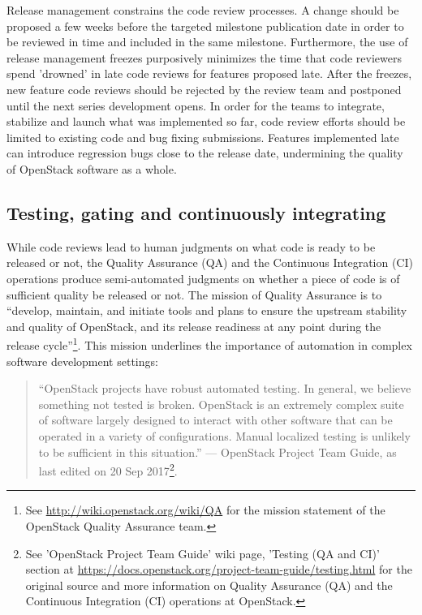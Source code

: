 \documentclass[dvipsnames]{bmcart}
\theoremstyle{definition}
\begin{document}
Release management constrains the code review processes.  A change should be proposed a few weeks before the targeted milestone publication date in order to be reviewed in time and included in the same milestone. Furthermore, the use of release management freezes purposively minimizes the time that code reviewers spend 'drowned' in late code reviews for features proposed late. After the freezes, new feature code reviews should be rejected by the review team and postponed until the next series development opens. In order for the teams to integrate, stabilize and launch what was implemented so far, code review efforts should be limited to existing code and bug fixing submissions. Features implemented late can introduce regression bugs close to the release date, undermining the quality of OpenStack software as a whole. 

\subsection{Testing, gating and continuously integrating} 

While code reviews lead to human judgments on what code is ready to be released or not, the Quality Assurance (QA) and the Continuous Integration (CI) operations produce semi-automated judgments on whether a piece of code is of sufficient quality be released or not.  The mission of Quality Assurance is to ``develop, maintain, and initiate tools and plans to ensure the upstream stability and quality of OpenStack, and its release readiness at any point during the release cycle''\footnote{See \url{http://wiki.openstack.org/wiki/QA} for the mission statement of the OpenStack Quality Assurance team.}. This mission underlines the importance of automation in complex software development settings:


\begin{quotation} 
\footnotesize
``OpenStack projects have robust automated testing. In general, we believe something not tested is broken. OpenStack is an extremely complex suite of software largely designed to interact with other software that can be operated in a variety of configurations. Manual localized testing is unlikely to be sufficient in this situation.''
--- OpenStack Project Team Guide, as last edited on 20 Sep 2017\footnote{See 'OpenStack Project Team Guide' wiki page, 'Testing (QA and CI)' section at \url{https://docs.openstack.org/project-team-guide/testing.html} for the original source and more information on Quality Assurance (QA) and the Continuous Integration (CI) operations at OpenStack.\label{qaci}}.

\end{quotation}
\end{document}
